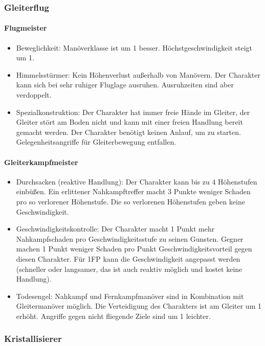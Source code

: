 \documentclass{article}
\begin{document}
\subsubsection{Gleiterflug}

\paragraph{Flugmeister}

\begin{itemize}
\item Beweglichkeit: Manöverklasse ist um 1 besser. Höchstgeschwindigkeit steigt um 1.
\item Himmelsstürmer: Kein Höhenverlust außerhalb von Manövern. Der Charakter kann sich bei sehr ruhiger Fluglage ausruhen. Ausruhzeiten sind aber verdoppelt.
\item Spezialkonstruktion: Der Charakter hat immer freie Hände im Gleiter, der Gleiter stört am Boden nicht und kann mit einer freien Handlung bereit gemacht werden. Der Charakter benötigt keinen Anlauf, um zu starten. Gelegenheitsangriffe für Gleiterbewegung entfallen.
\end{itemize}

\paragraph{Gleiterkampfmeister}

\begin{itemize}
\item Durchsacken (reaktive Handlung): Der Charakter kann bis zu 4 Höhenstufen einbüßen. Ein erlittener Nahkampftreffer macht 3 Punkte weniger Schaden pro so verlorener Höhenstufe. Die so verlorenen Höhenstufen geben keine Geschwindigkeit.
\item Geschwindigkeitskontrolle: Der Charakter macht 1 Punkt mehr Nahkampfschaden pro Geschwindigkeitsstufe zu seinen Gunsten. Gegner machen 1 Punkt weniger Schaden pro Punkt Geschwindigkeitsvorteil gegen diesen Charakter. Für 1FP kann die Geschwindigkeit angepasst werden (schneller oder langsamer, das ist auch reaktiv möglich und kostet keine Handlung).
\item Todesengel: Nahkampf und Fernkampfmanöver sind in Kombination mit Gleitermanöver möglich. Die Verteidigung des Charakters ist am Gleiter um 1 erhöht. Angriffe gegen nicht fliegende Ziele sind um 1 leichter.
\end{itemize}

\subsubsection{Kristallisierer}
\end{document}
